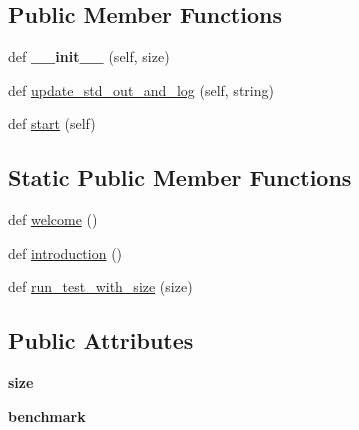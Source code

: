 \subsection*{Public Member Functions}
\begin{DoxyCompactItemize}
\item 
def {\bfseries \+\_\+\+\_\+init\+\_\+\+\_\+} (self, size)\hypertarget{classhal_1_1profile_1_1performance_1_1_eight_queen_test_aff4c0640adbaf044ee1a2f1d20480647}{}\label{classhal_1_1profile_1_1performance_1_1_eight_queen_test_aff4c0640adbaf044ee1a2f1d20480647}

\item 
def \hyperlink{classhal_1_1profile_1_1performance_1_1_eight_queen_test_a39eed18e353b03f5ab738496826544f0}{update\+\_\+std\+\_\+out\+\_\+and\+\_\+log} (self, string)
\item 
def \hyperlink{classhal_1_1profile_1_1performance_1_1_eight_queen_test_aae7444405fb2139e4261aa639e27892f}{start} (self)
\end{DoxyCompactItemize}
\subsection*{Static Public Member Functions}
\begin{DoxyCompactItemize}
\item 
def \hyperlink{classhal_1_1profile_1_1performance_1_1_eight_queen_test_a981be709c0e10f0098a8c58af1929746}{welcome} ()
\item 
def \hyperlink{classhal_1_1profile_1_1performance_1_1_eight_queen_test_a570aa1a773c9d24cca31e6a42e852fd4}{introduction} ()
\item 
def \hyperlink{classhal_1_1profile_1_1performance_1_1_eight_queen_test_a1830ea92c280cbd39a65c7fc36176e89}{run\+\_\+test\+\_\+with\+\_\+size} (size)
\end{DoxyCompactItemize}
\subsection*{Public Attributes}
\begin{DoxyCompactItemize}
\item 
{\bfseries size}\hypertarget{classhal_1_1profile_1_1performance_1_1_eight_queen_test_afefe08b8ae5a8a787f867d97cc2d6ad4}{}\label{classhal_1_1profile_1_1performance_1_1_eight_queen_test_afefe08b8ae5a8a787f867d97cc2d6ad4}

\item 
{\bfseries benchmark}\hypertarget{classhal_1_1profile_1_1performance_1_1_eight_queen_test_a537a15f71e5641f883b9e54acd04d163}{}\label{classhal_1_1profile_1_1performance_1_1_eight_queen_test_a537a15f71e5641f883b9e54acd04d163}

\end{DoxyCompactItemize}


